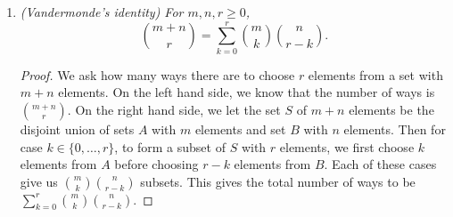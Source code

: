 \documentclass{article}
\begin{document}
\begin{enumerate}[label={\bf Q\arabic*:}]
  \item \it (Vandermonde's identity) For $m,n,r\geq0$,
    \[\binom{m+n}{r} =\sum_{k=0}^r\binom{m}{k}\binom{n}{r-k}.\]

    \begin{proof}
      We ask how many ways there are to choose $r$ elements from a set with
      $m+n$ elements. On the left hand side, we know that the number of
      ways is $\binom{m+n}{r}$. On the right hand side, we let the set $S$ of
      $m+n$ elements be the disjoint union of sets $A$ with $m$ elements
      and set $B$ with $n$ elements. Then for case $k\in\{0,\ldots,r\}$, to
      form a subset of $S$ with $r$ elements, we first choose $k$ elements
      from $A$ before choosing $r-k$ elements from $B$. Each of these cases
      give us $\binom{m}{k}\binom{n}{r-k}$ subsets. This gives the total
      number of ways to be $\sum_{k=0}^r\binom{m}{k}\binom{n}{r-k}$.
    \end{proof}
\end{enumerate}
\end{document}
